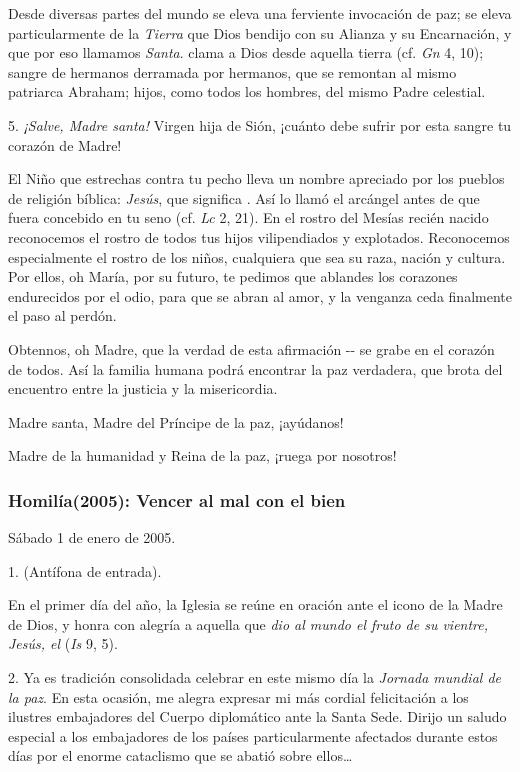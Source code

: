 \begin{body}
\begin{body}
Desde diversas partes del mundo se eleva una ferviente invocación de paz; se eleva particularmente de la \emph{Tierra} que Dios bendijo con su Alianza y su Encarnación, y que por eso llamamos \emph{Santa}.  clama a Dios desde aquella tierra (cf. \emph{Gn} 4, 10); sangre de hermanos derramada por hermanos, que se remontan al mismo patriarca Abraham; hijos, como todos los hombres, del mismo Padre celestial.

5. \emph{¡Salve, Madre santa!} Virgen hija de Sión, ¡cuánto debe sufrir por esta sangre tu corazón de Madre!

El Niño que estrechas contra tu pecho lleva un nombre apreciado por los pueblos de religión bíblica: \emph{Jesús}, que significa . Así lo llamó el arcángel antes de que fuera concebido en tu seno (cf. \emph{Lc} 2, 21). En el rostro del Mesías recién nacido reconocemos el rostro de todos tus hijos vilipendiados y explotados. Reconocemos especialmente el rostro de los niños, cualquiera que sea su raza, nación y cultura. Por ellos, oh María, por su futuro, te pedimos que ablandes los corazones endurecidos por el odio, para que se abran al amor, y la venganza ceda finalmente el paso al perdón.

Obtennos, oh Madre, que la verdad de esta afirmación -- se grabe en el corazón de todos. Así la familia humana podrá encontrar la paz verdadera, que brota del encuentro entre la justicia y la misericordia.

Madre santa, Madre del Príncipe de la paz, ¡ayúdanos!

Madre de la humanidad y Reina de la paz, ¡ruega por nosotros!

\subsubsection{Homilía(2005): Vencer al mal con el bien}

Sábado 1 de enero de 2005.

1.  (Antífona de entrada).

En el primer día del año, la Iglesia se reúne en oración ante el icono de la Madre de Dios, y honra con alegría a aquella que \emph{dio al mundo el fruto de su vientre, Jesús, el } (\emph{Is} 9, 5).

2. Ya es tradición consolidada celebrar en este mismo día la \emph{Jornada mundial de la paz}. En esta ocasión, me alegra expresar mi más cordial felicitación a los ilustres embajadores del Cuerpo diplomático ante la Santa Sede. Dirijo un saludo especial a los embajadores de los países particularmente afectados durante estos días por el enorme cataclismo que se abatió sobre ellos\ldots{}


\end{body}
\end{body}
